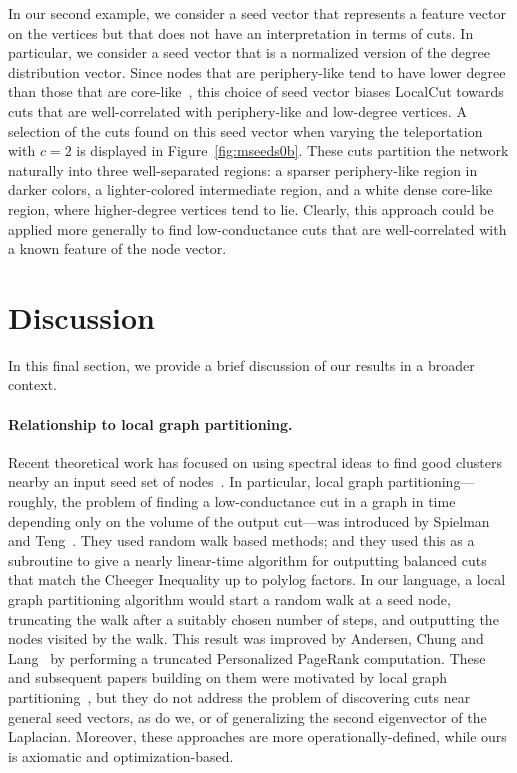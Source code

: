 \documentclass[11pt]{article}
\begin{document}
In our second example, we consider a seed vector that represents a feature 
vector on the vertices but that does not have an interpretation in terms of 
cuts. 
In particular, we consider a seed vector that is a normalized version of the 
degree distribution vector. 
Since nodes that are periphery-like tend to have lower degree than those that
are core-like~\cite{LLDM08_communities_CONF,LLDM09_communities_IM,LLM10_communities_CONF},
this choice of seed vector biases \textsf{LocalCut} 
towards cuts that are well-correlated with periphery-like and low-degree 
vertices.
A selection of the cuts found on this seed vector when varying the 
teleportation with $c=2$ is displayed in Figure~\ref{fig:mseeds0b}. 
These cuts partition the network naturally into three well-separated 
regions: a sparser periphery-like region in darker colors, a lighter-colored 
intermediate region, and a white dense core-like region, where higher-degree 
vertices tend to lie. 
Clearly, this approach could be applied more generally to find 
low-conductance cuts that are well-correlated with a known feature of the 
node vector.




\section{Discussion}
\label{sxn:discussion}

In this final section, we provide a brief discussion of our results in a 
broader context.

\paragraph{Relationship to local graph partitioning.} 
Recent theoretical work has focused on using spectral ideas to find good 
clusters nearby an input seed set of 
nodes~\cite{Spielman:2004,andersen06local,chung07_fourproofs}. 
In particular, local graph partitioning---roughly, the problem of finding a 
low-conductance cut in a graph in time depending only on the volume of the 
output cut---was introduced by Spielman and Teng~\cite{Spielman:2004}. 
They used random walk based methods; and they used this as a subroutine to 
give a nearly linear-time algorithm for outputting balanced cuts that match 
the Cheeger Inequality up to polylog factors. 
In our language, a local graph partitioning algorithm would start a random 
walk at a seed node, truncating the walk after a suitably chosen number of 
steps, and outputting the nodes visited by the walk. 
This result was improved  by Andersen, Chung and Lang~\cite{andersen06local} 
by performing a truncated Personalized PageRank computation. 
These and subsequent papers building on them were motivated by local graph 
partitioning~\cite{chung07_fourproofs}, but they do not address the problem 
of discovering cuts near general seed vectors, as do we, or of generalizing 
the second eigenvector of the Laplacian. 
Moreover, these approaches are more operationally-defined, while ours is 
axiomatic and optimization-based. 
\end{document}
